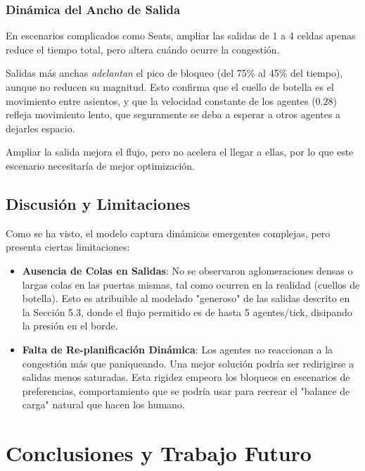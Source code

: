\documentclass[11pt,spanish,listoffigures,listoftables]{tfgetsinf}
\begin{document}
\subsection{Dinámica del Ancho de Salida}
En escenarios complicados como Seats, ampliar las salidas de 1 a 4 celdas apenas reduce el tiempo total, pero altera cuándo ocurre la congestión. 

Salidas más anchas \textit{adelantan} el pico de bloqueo (del 75\% al 45\% del tiempo), aunque no reducen su magnitud. Esto confirma que el cuello de botella es el movimiento entre asientos, y que la velocidad constante de los agentes (0.28) refleja movimiento lento, que seguramente se deba a esperar a otros agentes a dejarles espacio. 

Ampliar la salida mejora el flujo, pero no acelera el llegar a ellas, por lo que este escenario necesitaría de mejor optimización.

\section{Discusión y Limitaciones}
Como se ha visto, el modelo captura dinámicas emergentes complejas, pero presenta ciertas limitaciones:
\begin{itemize}
    \item \textbf{Ausencia de Colas en Salidas}: No se observaron aglomeraciones densas o largas colas en las puertas mismas, tal como ocurren en la realidad (cuellos de botella). Esto es atribuible al modelado "generoso" de las salidas descrito en la Sección 5.3, donde el flujo permitido es de hasta 5 agentes/tick, disipando la presión en el borde.
    \item \textbf{Falta de Re-planificación Dinámica}: Los agentes no reaccionan a la congestión más que paniqueando. Una mejor solución podría ser redirigirse a salidas menos saturadas. Esta rigidez empeora los bloqueos en escenarios de preferencias, comportamiento que se podría usar para recrear el "balance de carga" natural que hacen los humano.
\end{itemize}

\chapter{Conclusiones y Trabajo Futuro}
\end{document}
